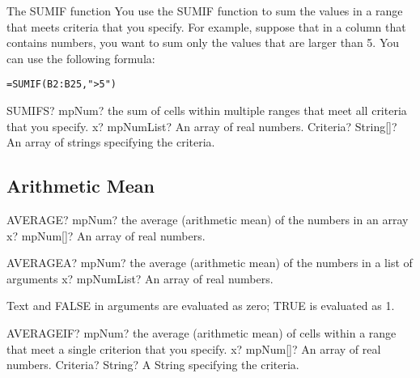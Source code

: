 \vspace{0.3cm}
The \textsf{SUMIF} function   You use the SUMIF function to sum the values in a range  that meets criteria that you specify. For example, suppose that in a column that contains numbers, you want to sum only the values that are larger than 5. You can use the following formula:

\begin{verbatim}
=SUMIF(B2:B25,">5")
\end{verbatim}


\vspace{0.3cm}
\begin{mpFunctionsExtract}
	\mpWorksheetFunctionTwoNotImplemented
	{SUMIFS? mpNum? the sum of cells within multiple ranges that meet all criteria that you specify.}
	{x? mpNumList? An array of real numbers.}
	{Criteria? String[]? An array of strings specifying the criteria.}
\end{mpFunctionsExtract}






\subsection{Arithmetic Mean}

\begin{mpFunctionsExtract}
	\mpWorksheetFunctionOneNotImplemented
	{AVERAGE? mpNum? the average (arithmetic mean) of the numbers in an array}
	{x? mpNum[]? An array of real numbers.}
\end{mpFunctionsExtract}


\vspace{0.6cm}
\begin{mpFunctionsExtract}
	\mpWorksheetFunctionOneNotImplemented
	{AVERAGEA? mpNum? the average (arithmetic mean) of the numbers in a list of arguments}
	{x? mpNumList? An array of real numbers.}
\end{mpFunctionsExtract}

\vspace{0.3cm}
Text and FALSE in arguments are evaluated as zero; TRUE is evaluated as 1.


\vspace{0.6cm}
\begin{mpFunctionsExtract}
	\mpWorksheetFunctionTwoNotImplemented
	{AVERAGEIF? mpNum? the average (arithmetic mean) of cells within a range that meet a single criterion that you specify.}
	{x? mpNum[]? An array of real numbers.}
	{Criteria? String? A String specifying the criteria.}
\end{mpFunctionsExtract}

